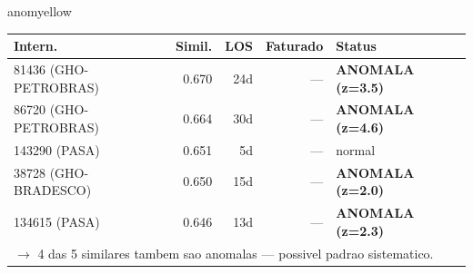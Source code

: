 \documentclass[a4paper,10pt]{article}
\begin{document}
\begin{anomalycard}[Internacao 67103 | PASA | MODERADO (z=2.09)]{anomyellow}
\begin{tabular}{l r r r l}\toprule\textbf{Intern.} & \textbf{Simil.} & \textbf{LOS} & \textbf{Faturado} & \textbf{Status} \\\midrule
81436 (GHO-PETROBRAS) & 0.670 & 24d & --- & \textcolor{anomred}{\textbf{ANOMALA (z=3.5)}} \\
86720 (GHO-PETROBRAS) & 0.664 & 30d & --- & \textcolor{anomred}{\textbf{ANOMALA (z=4.6)}} \\
143290 (PASA) & 0.651 & 5d & --- & \textcolor{jcubeblue}{normal} \\
38728 (GHO-BRADESCO) & 0.650 & 15d & --- & \textcolor{anomred}{\textbf{ANOMALA (z=2.0)}} \\
134615 (PASA) & 0.646 & 13d & --- & \textcolor{anomred}{\textbf{ANOMALA (z=2.3)}} \\
\multicolumn{5}{l}{\textcolor{anomred}{\small $\rightarrow$ 4 das 5 similares tambem sao anomalas --- possivel padrao sistematico.}} \\
\bottomrule\end{tabular}



\end{anomalycard}

\newpage
\end{document}
